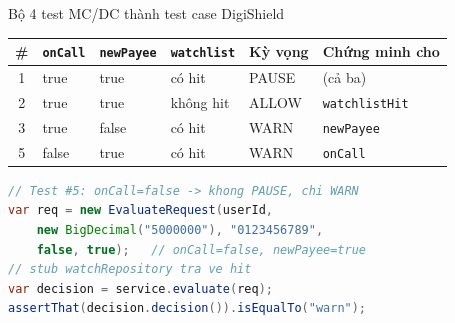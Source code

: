 \documentclass[aspectratio=169,12pt]{beamer}
\begin{document}
\begin{frame}[fragile]{Bộ 4 test MC/DC thành test case DigiShield}
  \begin{center}
  \small
  \begin{tabular}{clllll}
    \toprule
    \# & \texttt{onCall} & \texttt{newPayee} & \texttt{watchlist} &
    \textbf{Kỳ vọng} & \textbf{Chứng minh cho} \\
    \midrule
    1 & true  & true  & có hit    & PAUSE & (cả ba) \\
    2 & true  & true  & không hit & ALLOW & \texttt{watchlistHit} \\
    3 & true  & false & có hit    & WARN  & \texttt{newPayee} \\
    5 & false & true  & có hit    & WARN  & \texttt{onCall} \\
    \bottomrule
  \end{tabular}
  \end{center}

\begin{lstlisting}[language=java,basicstyle=\ttfamily\footnotesize]
// Test #5: onCall=false -> khong PAUSE, chi WARN
var req = new EvaluateRequest(userId,
    new BigDecimal("5000000"), "0123456789",
    false, true);   // onCall=false, newPayee=true
// stub watchRepository tra ve hit
var decision = service.evaluate(req);
assertThat(decision.decision()).isEqualTo("warn");
\end{lstlisting}
\end{frame}
\end{document}
